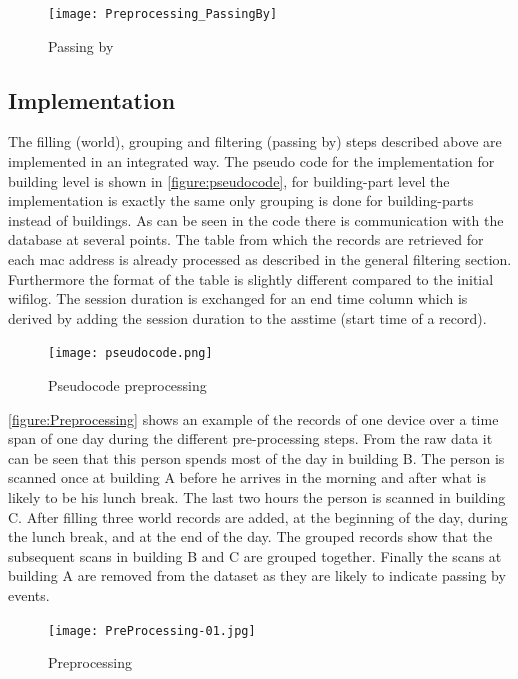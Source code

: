 \begin{figure}[H]
\centering
\texttt{[image: Preprocessing\_PassingBy]}
\captionsetup{justification=centering}
\caption{Passing by}
\label{figure:passing by}
\end{figure}

\subsection{Implementation}
The filling (world), grouping and filtering (passing by) steps described above are implemented in an integrated way. The pseudo code for the implementation for building level is shown in \autoref{figure:pseudocode}, for building-part level the implementation is exactly the same only grouping is done for building-parts instead of buildings. As can be seen in the code there is communication with the database at several points. The table from which the records are retrieved for each mac address is already processed as described in the general filtering section. Furthermore the format of the table is slightly different compared to the initial wifilog. The session duration is exchanged for an end time column which is derived by adding the session duration to the asstime (start time of a record).

\begin{figure}[H]
\centering
\texttt{[image: pseudocode.png]}
\captionsetup{justification=centering}
\caption{Pseudocode preprocessing}
\label{figure:pseudocode}
\end{figure}

\autoref{figure:Preprocessing} shows an example of the records of one device over a time span of one day during the different pre-processing steps. From the raw data it can be seen that this person spends most of the day in building B. The person is scanned once at building A before he arrives in the morning and after what is likely to be his lunch break. The last two hours the person is scanned in building C. After filling three world records are added, at the beginning of the day, during the lunch break, and at the end of the day. The grouped records show that the subsequent scans in building B and C are grouped together. Finally the scans at building A are removed from the dataset as they are likely to indicate passing by events. 

\begin{figure}[H]
\centering
\texttt{[image: PreProcessing-01.jpg]}
\captionsetup{justification=centering}
\caption{Preprocessing}
\label{figure:Preprocessing}
\end{figure}

